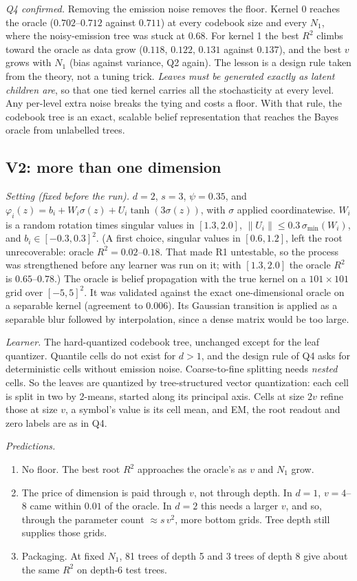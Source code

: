 \documentclass[11pt]{article}
\theoremstyle{definition}
\newcommand{\norm}[1]{\lVert #1\rVert}
\begin{document}
\noindent\emph{Q4 confirmed.} Removing the emission noise removes the floor. Kernel 0 reaches the
oracle ($0.702$--$0.712$ against $0.711$) at every codebook size and every $N_1$, where the noisy-emission
tree was stuck at $0.68$. For kernel 1 the best $R^2$ climbs toward the oracle as data grow ($0.118$,
$0.122$, $0.131$ against $0.137$), and the best $v$ grows with $N_1$ (bias against variance, Q2 again).
The lesson is a design rule taken from the theory, not a tuning trick. \emph{Leaves must be generated
exactly as latent children are}, so that one tied kernel carries all the stochasticity at every level.
Any per-level extra noise breaks the tying and costs a floor. With that rule, the codebook tree is an
exact, scalable belief representation that reaches the Bayes oracle from unlabelled trees.

\subsection{V2: more than one dimension}\label{sec:v2}
\emph{Setting (fixed before the run).} $d=2$, $s=3$, $\psi=0.35$, and
$\varphi_i(z)=b_i+W_i\sigma(z)+U_i\tanh(3\sigma(z))$, with $\sigma$ applied coordinatewise. $W_i$ is a random
rotation times singular values in $[1.3,2.0]$, $\norm{U_i}\le0.3\,\sigma_{\min}(W_i)$, and $b_i\in[-0.3,0.3]^2$.
(A first choice, singular values in $[0.6,1.2]$, left the root unrecoverable: oracle $R^2=0.02$--$0.18$.
That made R1 untestable, so the process was strengthened before any learner was run on it; with
$[1.3,2.0]$ the oracle $R^2$ is $0.65$--$0.78$.) The oracle is belief propagation with the true kernel on a
$101\times101$ grid over $[-5,5]^2$. It was validated against the exact one-dimensional oracle on a
separable kernel (agreement to $0.006$). Its
Gaussian transition is applied as a separable blur followed by interpolation, since a dense matrix
would be too large.

\emph{Learner.} The hard-quantized codebook tree, unchanged except for the leaf quantizer. Quantile cells
do not exist for $d>1$, and the design rule of Q4 asks for deterministic cells without emission noise.
Coarse-to-fine splitting needs \emph{nested} cells. So the leaves are quantized by tree-structured
vector quantization: each cell is split in two by 2-means, started along its principal axis. Cells at
size $2v$ refine those at size $v$, a symbol's value is its cell mean, and EM, the root readout and zero
labels are as in Q4.

\emph{Predictions.}
\begin{enumerate}
\item[(R1)] No floor. The best root $R^2$ approaches the oracle's as $v$ and $N_1$ grow.
\item[(R2)] The price of dimension is paid through $v$, not through depth. In $d=1$, $v=4$--$8$ came
within $0.01$ of the oracle. In $d=2$ this needs a larger $v$, and so, through the parameter count
$\approx s\,v^2$, more bottom grids. Tree depth still supplies those grids.
\item[(R3)] Packaging. At fixed $N_1$, 81 trees of depth 5 and 3 trees of depth 8 give about the same
$R^2$ on depth-6 test trees.
\end{enumerate}
\end{document}
